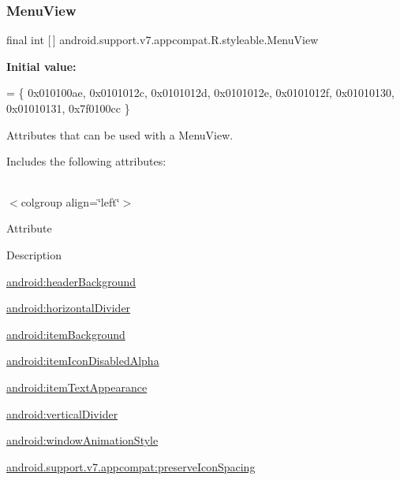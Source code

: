 \subsubsection{\texorpdfstring{Menu\+View}{MenuView}}
{\footnotesize\ttfamily final int \mbox{[}$\,$\mbox{]} android.\+support.\+v7.\+appcompat.\+R.\+styleable.\+Menu\+View\hspace{0.3cm}{\ttfamily [static]}}

{\bfseries Initial value\+:}
\begin{DoxyCode}
= \{
            0x010100ae, 0x0101012c, 0x0101012d, 0x0101012e,
            0x0101012f, 0x01010130, 0x01010131, 0x7f0100cc
        \}
\end{DoxyCode}
Attributes that can be used with a Menu\+View. 

Includes the following attributes\+:

\tabulinesep=1mm
\begin{longtabu} spread 0pt [c]{*{0}{|X[-1]}|}
\hline
\end{longtabu}
$<$colgroup align=\char`\"{}left\char`\"{}$>$ 

Attribute

Description 

{\ttfamily \hyperlink{classandroid_1_1support_1_1v7_1_1appcompat_1_1R_1_1styleable_a9c0eeec4e3e6054bad955d013d985d26}{android\+:header\+Background}}

{\ttfamily \hyperlink{classandroid_1_1support_1_1v7_1_1appcompat_1_1R_1_1styleable_a8fc0d8471f20ad27ea31f2f6e91a7c4e}{android\+:horizontal\+Divider}}

{\ttfamily \hyperlink{classandroid_1_1support_1_1v7_1_1appcompat_1_1R_1_1styleable_ab077ea4deb3c1bc7536b4f0339e92b0a}{android\+:item\+Background}}

{\ttfamily \hyperlink{classandroid_1_1support_1_1v7_1_1appcompat_1_1R_1_1styleable_afb79e93a74e10b7276373c5811009513}{android\+:item\+Icon\+Disabled\+Alpha}}

{\ttfamily \hyperlink{classandroid_1_1support_1_1v7_1_1appcompat_1_1R_1_1styleable_a6a5f97c5e220a37019516cf6bff0ccb8}{android\+:item\+Text\+Appearance}}

{\ttfamily \hyperlink{classandroid_1_1support_1_1v7_1_1appcompat_1_1R_1_1styleable_aaa05173a2f852ccfca3b7df5fefadbdd}{android\+:vertical\+Divider}}

{\ttfamily \hyperlink{classandroid_1_1support_1_1v7_1_1appcompat_1_1R_1_1styleable_abfc971adc049e070d2cbed01ebde0129}{android\+:window\+Animation\+Style}}

{\ttfamily \hyperlink{classandroid_1_1support_1_1v7_1_1appcompat_1_1R_1_1styleable_a8b0fb09a515b636405db851879e9fb7d}{android.\+support.\+v7.\+appcompat\+:preserve\+Icon\+Spacing}}

